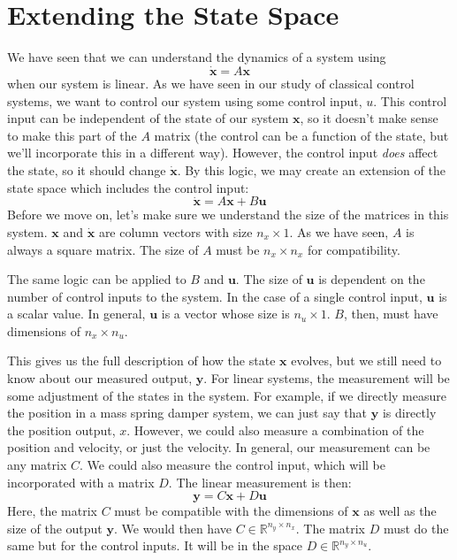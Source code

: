 \section{Extending the State Space}
We have seen that we can understand the dynamics of a system using 
$$\bm{\dot{x}}=A\bm{x}$$ when our system is linear. As we have seen in our study of classical control systems, we want to control our system using some control input, $u$. This control input can be independent of the state of our system $\bm{x}$, so it doesn't make sense to make this part of the $A$ matrix (the control can be a function of the state, but we'll incorporate this in a different way). However, the control input \textit{does} affect the state, so it should change $\bm{\dot{x}}$. By this logic, we may create an extension of the state space which includes the control input:
$$\bm{\dot{x}}=A\bm{x}+B\bm{u}$$
Before we move on, let's make sure we understand the size of the matrices in this system. $\bm{x}$ and $\bm{\dot{x}}$ are column vectors with size $n_x\times 1$. As we have seen, $A$ is always a square matrix. The size of $A$ must be $n_x\times n_x$ for compatibility.  

The same logic can be applied to $B$ and $\bm{u}$. The size of $\bm{u}$ is dependent on the number of control inputs to the system. In the case of a single control input, $\bm{u}$ is a scalar value. In general, $\bm{u}$ is a vector whose size is $n_u\times 1$. $B$, then, must have dimensions of $n_x\times n_u$.

This gives us the full description of how the state $\bm{x}$ evolves, but we still need to know about our measured output, $\bm{y}$. For linear systems, the measurement will be some adjustment of the states in the system. For example, if we directly measure the position in a mass spring damper system, we can just say that $\bm{y}$ is directly the position output, $x$. However, we could also measure a combination of the position and velocity, or just the velocity. In general, our measurement can be any matrix $C$. We could also measure the control input, which will be incorporated with a matrix $D$. The linear measurement is then:
$$\bm{y}=C\bm{x}+D\bm{u}$$
Here, the matrix $C$ must be compatible with the dimensions of $\bm{x}$ as well as the size of the output $\bm{y}$. We would then have $C\in\mathbb{R}^{n_y\times n_x}$. The matrix $D$ must do the same but for the control inputs. It will be in the space $D\in\mathbb{R}^{n_y\times n_u}$.

